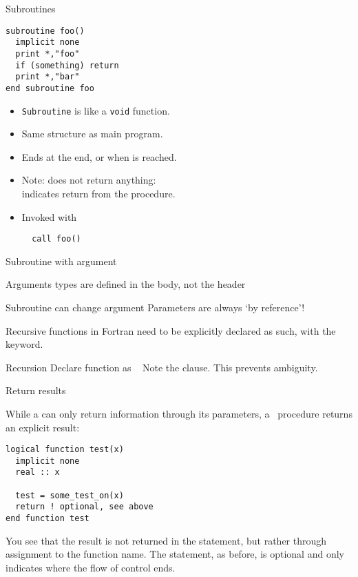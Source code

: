 \begin{slide}{Subroutines}
  \label{sl:subroutine}
\begin{lstlisting}
subroutine foo()
  implicit none
  print *,"foo"
  if (something) return
  print *,"bar"
end subroutine foo
\end{lstlisting}
\begin{itemize}
\item \lstinline{Subroutine} is like a \lstinline{void} function.
\item Same structure as main program.
\item Ends at the end, or when  is reached.
\item Note:  does not return anything:\\
  indicates return from the procedure.
\item Invoked with 
\begin{lstlisting}
  call foo()
\end{lstlisting}
\end{itemize}
\end{slide}

\begin{block}{Subroutine with argument}
  \label{sl:fsubr-arg}

  Arguments types are defined in the body, not the header
\end{block}

\begin{block}{Subroutine can change argument}
  \label{sl:fsubr-inout}
  Parameters are always `by reference'!
\end{block}

Recursive functions in Fortran need to be explicitly declared as such,
with the  keyword.

\begin{block}{Recursion}
  \label{sl:funcf:recursion}
  Declare function as ~
  Note the  clause. This prevents ambiguity.
\end{block}

 {Return results}

While a  can only return information through its parameters,
a~ procedure returns an explicit result:
\begin{lstlisting}
logical function test(x)
  implicit none
  real :: x

  test = some_test_on(x)
  return ! optional, see above
end function test
\end{lstlisting}
You see that the result is not returned in the  statement,
but rather through assignment to the function name. The 
statement, as before, is optional and only indicates where the flow of
control ends.

